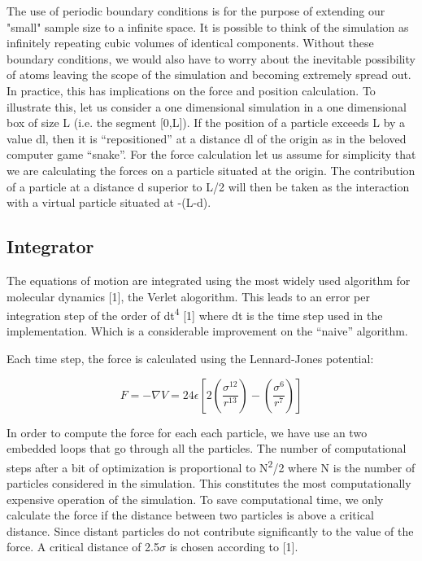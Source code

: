 \documentclass[10pt,letterpaper]{article}
\begin{document}
The use of periodic boundary conditions is for the purpose of extending our "small" sample size to a infinite space. It is possible to think of the simulation as infinitely repeating cubic volumes of identical components. Without these boundary conditions, we would also have to worry about the inevitable possibility of atoms leaving the scope of the simulation and becoming extremely spread out. In practice, this has implications on the force and position calculation. To illustrate this, let us consider a one dimensional simulation in a one dimensional box of size L (i.e. the segment [0,L]). If the position of a particle exceeds L by a value dl, then it is “repositioned” at a distance dl of the origin as in the beloved computer game “snake”. For the force calculation let us assume for simplicity that we are calculating the forces on a particle situated at the origin. The contribution of a particle at a distance d superior to L/2 will then be taken as the interaction with a virtual particle situated at -(L-d).

\subsection{Integrator}

The equations of motion are integrated using the most widely used algorithm for molecular dynamics [1], the Verlet alogorithm. This leads to an error per integration step of the order of dt\textsuperscript{4} [1] where dt is the time step used in the implementation. Which is a considerable improvement on the “naive” algorithm. 

Each time step, the force is calculated using the Lennard-Jones potential:

\begin{equation}
F = -{\nabla}{V} = 24{\epsilon}[2(\frac{\sigma^{12}}{r^{13}}) - (\frac{\sigma^6}{r^7})]
\end{equation}

In order to compute the force for each each particle, we have use an two embedded loops that go through all the particles. The number of computational steps after a bit of optimization is proportional to N\textsuperscript{2}/2 where N is the number of particles considered in the simulation. This constitutes the most computationally expensive operation of the simulation. To save computational time, we only calculate the force if the distance between two particles is above a critical distance.  Since distant particles do not contribute significantly to the value of the force. A critical distance of 2.5$\sigma$ is chosen according to [1].
\vspace{5mm}
\end{document}
